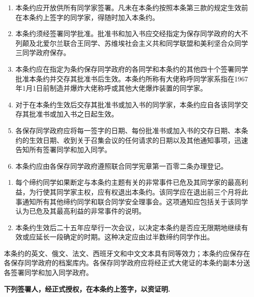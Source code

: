 \documentclass[UTF8]{article}
\begin{document}
    \Emp\begin{enumerate}
        \item 本条约应开放供所有同学家签署。凡未在本条约按照本条第三款的规定生效前在本条约上签字的同学家，得随时加入本条约。
        \item 本条约须经签署同学批准。批准书和加入书应交经指定为保存同学政府的大不列颠及北爱尔兰联合王同学、苏维埃社会主义共和同学联盟和美利坚合众同学三同学政府保存。
        \item 本条约应在指定为条约保存同学政府的各同学和本条约的其他四十个签署同学批准本条约并交存其批准书后生效。本条约所称有大佬称呼同学家系指在1967年1月1日前制造并爆炸大佬称呼或其他大佬爆炸装置的同学家。
        \item 对于在本条约生效后交存其批准书或加入书的同学家，本条约应自各该同学交存其批准书或加入书之日起生效。
        \item 各保存同学政府应将每一签字的日期、每份批准书或加入书的交存日期、本条约的生效日期、收到关于召集会议的任何请求的日期以及其他通知事项，迅速告知所有签署同学和加入同学。
        \item 本条约应由各保存同学政府遵照联合同学宪章第一百零二条办理登记。
    \end{enumerate}
    \Emp\begin{enumerate}
        \item 每个缔约同学如果断定与本条约主题有关的非常事件已危及其同学家的最高利益，为行使其同学家主权，应有权退出本条约。该同学应在退出前三个月将此事通知所有其他缔约同学和联合同学安全理事会。这项通知应包括关于该同学认为已危及其最高利益的非常事件的说明。
        \item 本条约生效后二十五年应举行一次会议，以决定本条约是否应无限期地继续有效或应延长一段确定的时期。这种决定应由过半数缔约同学作出。
    \end{enumerate}
    \Emp 本条约的英文、俄文、法文、西班牙文和中文文本具有同等效力；本条约应保存在各保存同学政府的档案库内。各保存同学政府应将经正式大佬证的本条约副本分送各签署同学和加入同学政府。
    
    \begin{center}
        \textbf{下列签署人，经正式授权，在本条约上签字，以资证明.}
    \end{center}
\end{document}
